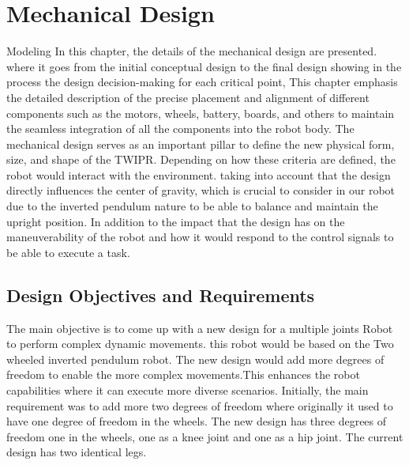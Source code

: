 \chapter{Mechanical Design}

\graphicspath{{./Figures/Mechanical Design/}}





 Modeling In this chapter, the details of the mechanical design are presented. where it goes from the initial conceptual design to the final design showing in the process the design decision-making for each critical point, This chapter emphasis the detailed description of the precise placement and alignment of different components such as the motors, wheels, battery, boards, and others to maintain the seamless integration of all the components into the robot body.
\newline
The mechanical design serves as an important pillar to define the new physical form, size, and shape of the TWIPR. Depending on how these criteria are defined, the robot would interact with the environment. taking into account that the design directly influences the center of gravity, which is crucial to consider in our robot due to the inverted pendulum nature to be able to balance and maintain the upright position. In addition to the impact that the design has on the maneuverability of the robot and how it would respond to the control signals to be able to execute a task.

\newpage


\section{Design Objectives and Requirements}

	The main objective is to come up with a new design for a multiple joints Robot to perform complex dynamic movements. this robot would be based on the Two wheeled inverted pendulum robot. The new design would add more degrees of freedom to enable the more complex movements.This enhances the robot capabilities where it can execute more diverse scenarios.
	Initially, the main requirement was to add more two degrees of freedom where originally it used to have one degree of freedom in the wheels. The new design has three degrees of freedom one in the wheels, one as a knee joint and one as a hip joint. The current design has two identical legs.

